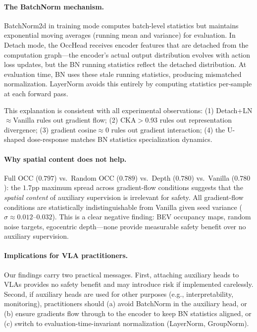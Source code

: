 \documentclass[10pt,letterpaper]{article}
\begin{document}
\paragraph{The BatchNorm mechanism.}
BatchNorm2d in training mode computes batch-level statistics but maintains exponential moving averages (running mean and variance) for evaluation. In Detach mode, the OccHead receives encoder features that are detached from the computation graph---the encoder's actual output distribution evolves with action loss updates, but the BN running statistics reflect the detached distribution. At evaluation time, BN uses these stale running statistics, producing mismatched normalization. LayerNorm avoids this entirely by computing statistics per-sample at each forward pass.

This explanation is consistent with all experimental observations: (1) Detach+LN$\approx$Vanilla rules out gradient flow; (2) CKA$>$0.93 rules out representation divergence; (3) gradient cosine$\approx$0 rules out gradient interaction; (4) the U-shaped dose-response matches BN statistics specialization dynamics.

\paragraph{Why spatial content does not help.}
Full OCC ($0.797$) vs.\ Random OCC ($0.789$) vs.\ Depth ($0.780$) vs.\ Vanilla ($0.780$): the $1.7$pp maximum spread across gradient-flow conditions suggests that the \emph{spatial content} of auxiliary supervision is irrelevant for safety. All gradient-flow conditions are statistically indistinguishable from Vanilla given seed variance ($\sigma \approx 0.012$--$0.032$). This is a clear negative finding: BEV occupancy maps, random noise targets, egocentric depth---none provide measurable safety benefit over no auxiliary supervision.

\paragraph{Implications for VLA practitioners.}
Our findings carry two practical messages. First, attaching auxiliary heads to VLAs provides no safety benefit and may introduce risk if implemented carelessly. Second, if auxiliary heads are used for other purposes (e.g., interpretability, monitoring), practitioners should (a) avoid BatchNorm in the auxiliary head, or (b) ensure gradients flow through to the encoder to keep BN statistics aligned, or (c) switch to evaluation-time-invariant normalization (LayerNorm, GroupNorm).
\end{document}
